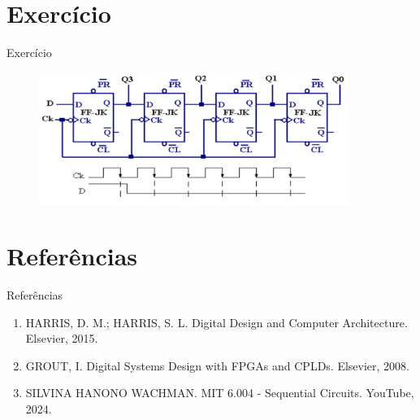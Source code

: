 \documentclass{beamer}
\begin{document}
\section{Exercício}

\begin{frame}{Exercício}
\begin{figure}
\centering
\includegraphics[width=0.9\textwidth]{figures/exer.png}
\end{figure}
\end{frame}


\section{Referências}

\begin{frame}{Referências}
\begin{enumerate}
    \item HARRIS, D. M.; HARRIS, S. L. Digital Design and Computer Architecture. Elsevier, 2015.
    \item GROUT, I. Digital Systems Design with FPGAs and CPLDs. Elsevier, 2008.
    \item SILVINA HANONO WACHMAN. MIT 6.004 - Sequential Circuits. YouTube, 2024.
\end{enumerate}
\end{frame}
\end{document}
